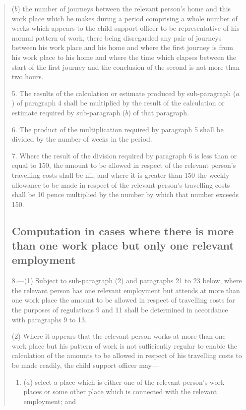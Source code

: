 \documentclass[a4paper]{article}
\begin{document}
\begin{quotation}
\begin{enumerate}
($b$) the number of journeys between the relevant person’s home and this work place which he makes during a period comprising a whole number of weeks which appears to the child support officer to be representative of his normal pattern of work, there being disregarded any pair of journeys between his work place and his home and where the first journey is from his work place to his home and where the time which elapses between the start of the first journey and the conclusion of the second is not more than two hours.
\end{enumerate}

\medskip

5.  The results of the calculation or estimate produced by sub-paragraph ($a$) of paragraph 4 shall be multiplied by the result of the calculation or estimate required by sub-paragraph ($b$) of that paragraph.

\medskip


6.  The product of the multiplication required by paragraph 5 shall be divided by the number of weeks in the period.

\medskip

7.  Where the result of the division required by paragraph 6 is less than or equal to 150, the amount to be allowed in respect of the relevant person’s travelling costs shall be nil, and where it is greater than 150 the weekly allowance to be made in respect of the relevant person’s travelling costs shall be 10 pence multiplied by the number by which that number exceeds 150.

\subsection*{Computation in cases where there is more than one work place but only one relevant employment}

8.—(1) Subject to sub-paragraph (2) and paragraphs 21 to 23 below, where the relevant person has one relevant employment but attends at more than one work place the amount to be allowed in respect of travelling costs for the purposes of regulations 9 and 11 shall be determined in accordance with paragraphs 9 to 13.

(2) Where it appears that the relevant person works at more than one work place but his pattern of work is not sufficiently regular to enable the calculation of the amounts to be allowed in respect of his travelling costs to be made readily, the child support officer may—
\begin{enumerate}\item[]
($a$) select a place which is either one of the relevant person’s work places or some other place which is connected with the relevant employment; and


\end{enumerate}
\end{quotation}
\end{document}
